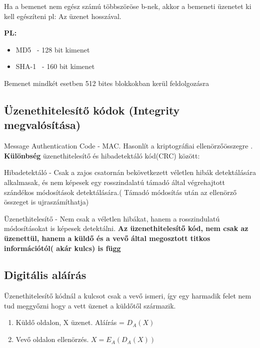 Ha a bemenet nem egész számú többszöröse b-nek, akkor a bemeneti üzenetet ki kell egészíteni pl: Az üzenet hosszával.

\textbf{PL:}
	\begin{itemize}
		\item MD5 \ - 128 bit kimenet
		\item SHA-1 \ - 160 bit kimenet
	\end{itemize}
	Bemenet mindkét esetben 512 bites blokkokban kerül feldolgozásra

\subsection{Üzenethitelesítő kódok (Integrity megvalósítása) }
Message Authentication Code - MAC. Hasonlít a kriptográfiai ellenörzőösszegre .\\[-2pt]

\textbf{Különbség} üzenethitelesítő és hibadetektáló kód(CRC) között:

\forceindent Hibadetektáló - Csak a zajos csatornán bekövetkezett véletlen hibák detektálására alkalmasak, és nem képesek egy rosszindalatú támadó által végrehajtott szándékos módosítások detektálására.( Támadó módosítás után az ellenörző összeget is ujraszámíthatja)

\forceindent Üzenethitelesítő - Nem csak a véletlen hibákat, hanem a rosszindulatú módosításokat is képesek detektálni.\textbf{ Az üzenethitelesítő kód, nem csak az üzenettül, hanem a küldő és a vevő által megosztott titkos információtól( akár kulcs) is függ}

\subsection{Digitális aláírás}

Üzenethitelesítő kódnál a kulcsot csak a vevő ismeri, így egy harmadik felet nem tud meggyőzni hogy a vett üzenet a küldőtől származik.

\begin{enumerate}
	\item Küldő oldalon, X üzenet. Aláírás = $D_A(X)$
	\item Vevő oldalon ellenörzés. $ X = E_A(D_A(X))$
\end{enumerate}
